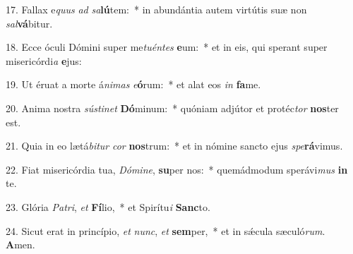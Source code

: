 17. Fallax e\textit{quus} \textit{ad} \textit{sa}\textbf{lú}tem:~*  in abundántia autem virtútis suæ non \textit{sal}\textbf{vá}bitur.\

18. Ecce óculi Dómini super me\textit{tu}\textit{én}\textit{tes} \textbf{e}um:~*  et in eis, qui sperant super misericórdi\textit{a} \textbf{e}jus:\

19. Ut éruat a morte á\textit{ni}\textit{mas} \textit{e}\textbf{ó}rum:~*  et alat eos \textit{in} \textbf{fa}me.\

20. Anima nostra \textit{sús}\textit{ti}\textit{net} \textbf{Dó}minum:~*  quóniam adjútor et protéc\textit{tor} \textbf{nos}ter est.\

21. Quia in eo lætá\textit{bi}\textit{tur} \textit{cor} \textbf{nos}trum:~*  et in nómine sancto ejus \textit{spe}\textbf{rá}vimus.\

22. Fiat misericórdia tua, \textit{Dó}\textit{mi}\textit{ne}, \textbf{su}per nos:~*  quemádmodum sperávi\textit{mus} \textbf{in} te.\

23. Glória \textit{Pa}\textit{tri}, \textit{et} \textbf{Fí}lio,~*  et Spirítu\textit{i} \textbf{Sanc}to.\

24. Sicut erat in princípio, \textit{et} \textit{nunc}, \textit{et} \textbf{sem}per,~*  et in sǽcula sæculó\textit{rum}. \textbf{A}men.\

